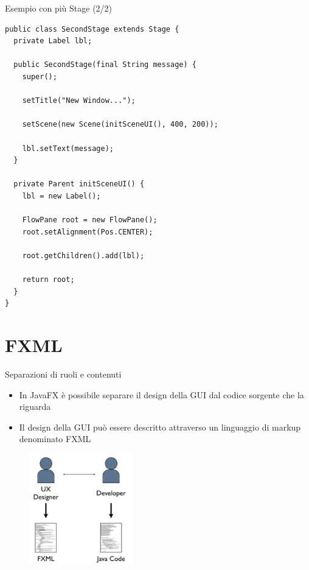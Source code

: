 \documentclass[presentation]{beamer}
\begin{document}
\begin{frame}[fragile]{Esempio con più Stage (2/2)}
\begin{lstlisting}[basicstyle=\tiny]
public class SecondStage extends Stage {
  private Label lbl;

  public SecondStage(final String message) {
    super();

	setTitle("New Window...");

	setScene(new Scene(initSceneUI(), 400, 200));

	lbl.setText(message);
  }

  private Parent initSceneUI() {
    lbl = new Label();

	FlowPane root = new FlowPane();
	root.setAlignment(Pos.CENTER);

	root.getChildren().add(lbl);

	return root;
  }
}
\end{lstlisting}
\end{frame}



\section{FXML}

\begin{frame}{Separazioni di ruoli e contenuti}
\begin{itemize}\itemsep10pt
\item In JavaFX è possibile separare il design della GUI dal codice sorgente che la riguarda
\item Il design della GUI può essere descritto attraverso un linguaggio di markup denominato FXML
\end{itemize}
\begin{figure}
\includegraphics[width=0.4\textwidth]{img/soc.png}
\end{figure}
\end{frame}
\end{document}
